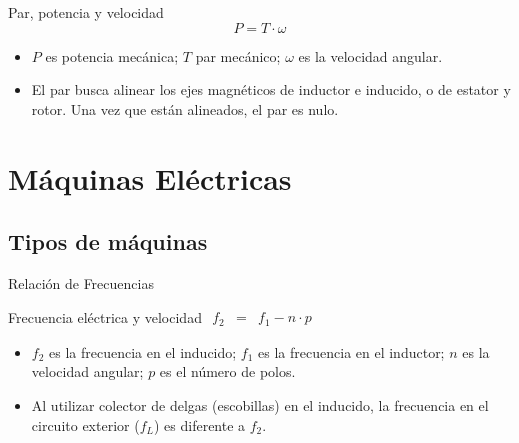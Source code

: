 \documentclass[xcolor={usenames,svgnames,dvipsnames}]{beamer}
\begin{document}
\begin{frame}[label={sec:org6958dfd}]{Par, potencia y velocidad}
\[
  P =  T \cdot \omega
\]


\begin{itemize}
\item \(P\) es potencia mecánica; \(T\) par mecánico; \(\omega\) es la velocidad
angular.

\item El par busca alinear los ejes magnéticos de inductor e inducido, o de
estator y rotor. Una vez que están alineados, el par es nulo.
\end{itemize}
\end{frame}

\section{Máquinas Eléctricas}
\label{sec:orgcb4d82e}


\subsection{Tipos de máquinas}
\label{sec:orgf2fd9b6}


\begin{frame}[label={sec:org253be6d}]{Relación de Frecuencias}
\begin{block}{Frecuencia eléctrica y velocidad}
\(\begin{aligned}
  f_{2} & = & f_{1}-n\cdot p\end{aligned}\)

\begin{itemize}
\item \(f_{2}\) es la frecuencia en el inducido; \(f_{1}\) es la frecuencia en
el inductor; \(n\) es la velocidad angular; \(p\) es el número de polos.

\item Al utilizar colector de delgas (escobillas) en el inducido, la
frecuencia en el circuito exterior (\(f_{L}\)) es diferente a \(f_{2}\).
\end{itemize}
\end{block}
\end{frame}
\end{document}
